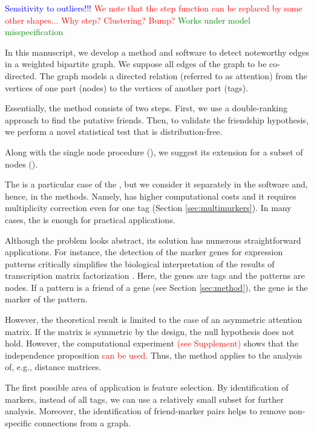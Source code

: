 \documentclass{llncs}
\begin{document}
\textcolor{blue}{Sensitivity to outliers!!!}
\textcolor{red}{We note that the step function can be replaced by some other shapes... Why step? Clustering? Bump?}
\textcolor{green}{Works under model misspecification}

In this manuscript, we develop a method and software to detect noteworthy edges in a weighted bipartite graph. We suppose all edges of the graph to be co-directed. The graph models a directed relation (referred to as attention) from the vertices of one part (nodes) to the vertices of another part (tags).

Essentially, the method consists of two steps. First, we use a double-ranking approach to find the putative friends. Then, to validate the friendship hypothesis, we perform a novel statistical test that is distribution-free.

Along with the single node procedure (), we suggest its extension for a subset of nodes ().

The  is a particular case of the , but we consider it separately in the software and, hence, in the methods. Namely,  has higher computational costs and it requires multiplicity correction even for one tag (Section \ref{sec:multimurkers}). In many cases, the  is enough for practical applications. 

Although the problem looks abstract, its solution has numerous straightforward applications. For instance, the detection of the marker genes \cite{stein-obrien_patternmarkers_2017} for expression patterns critically simplifies the biological interpretation of the results of transcription matrix factorization \cite{Stein_2018,Fertig_2016}. Here, the genes are tags and the patterns are nodes. If a pattern is a friend of a gene (see Section \ref{sec:method}), the gene is the marker of the pattern.

However, the theoretical result is limited to the case of an asymmetric attention matrix. If the matrix is symmetric by the design, the null hypothesis does not hold. However, the computational experiment \textcolor{red}{(see Supplement)} shows that the independence proposition \textcolor{red}{can be used}. Thus, the method applies to the analysis of, e.g., distance matrices. 

The first possible area of application is feature selection. By identification of markers, instead of all tags, we can use a relatively small subset for further analysis. Moreover, the identification of friend-marker pairs helps to remove non-specific connections from a graph. 
\end{document}
